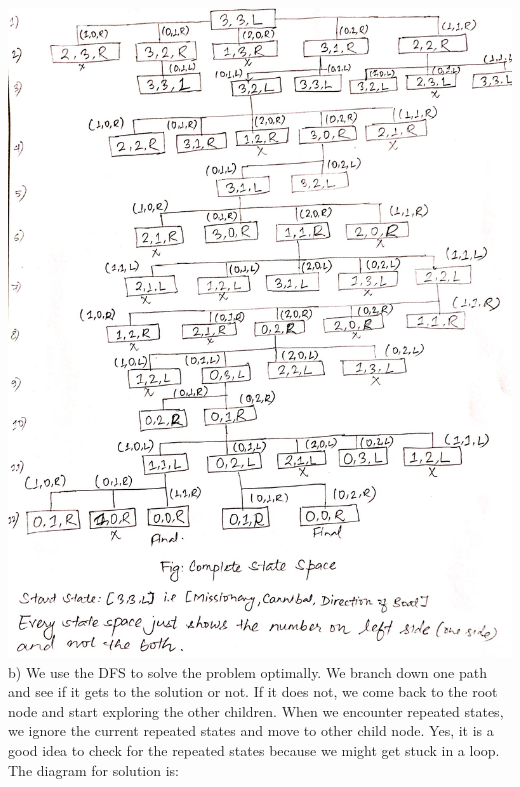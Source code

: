 \documentclass[11pt]{article}
\begin{document}
\includegraphics[width=150mm]{a.jpg}\\
b) We use the DFS to solve the problem optimally. We branch down one path and see if it gets to the solution or not. If it does not, we come back to the root
node and start exploring the other children. When we encounter repeated states, we ignore the current repeated states and move to other child node.
Yes, it is a good idea to check for the repeated states because we might get stuck in a loop.\\
The diagram for solution is:\\
\end{document}
